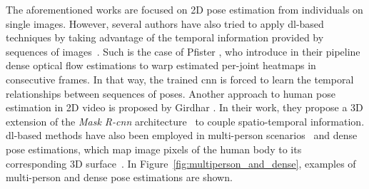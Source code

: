 The aforementioned works are focused on 2D pose estimation from individuals on single images. However, several authors have also tried to apply \gls{dl}-based techniques by taking advantage of the temporal information provided by sequences of images~\cite{Jain2015-zb, Pfister2015-ae, Song2017-fe, Girdhar2018-lx}. Such is the case of Pfister \etal\cite{Pfister2015-ae}, who introduce in their pipeline dense optical flow estimations to warp estimated per-joint heatmaps in consecutive frames. In that way, the trained \gls{cnn} is forced to learn the temporal relationships between sequences of poses. Another approach to human pose estimation in 2D video is proposed by Girdhar \etal\cite{Girdhar2018-lx}. In their work, they propose a 3D extension of the \emph{Mask R-\gls{cnn}} architecture~\cite{he2017mask} to couple spatio-temporal information. \gls{dl}-based methods have also been employed in multi-person scenarios~\cite{cao2018openpose, Iqbal2017-nu, Papandreou2017-nk, Insafutdinov2017-zx} and dense pose estimations, which map image pixels of the human body to its corresponding 3D surface~\cite{Alp_Guler2018-rg}. In Figure~\ref{fig:multiperson_and_dense}, examples of multi-person and dense pose estimations are shown.

